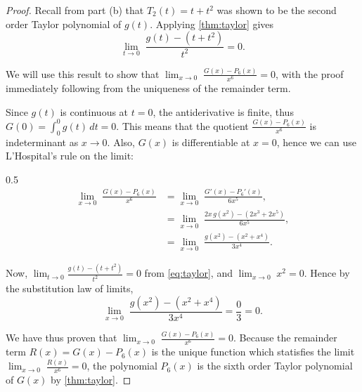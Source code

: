 \begin{enumerate}
\begin{enumerate}
\begin{proof}
                    Recall from part (b) that $T_2(t) = t + t^2$ was shown to be the second order Taylor polynomial of $g(t)$.
                    Applying \cref{thm:taylor} gives
                    \begin{equation} \label{eq:taylor}
                        \lim_{t \to 0} \; \frac{g(t) - (t + t^2)}{t^2} = 0.
                    \end{equation}

                    We will use this result to show that $\lim_{x \to 0} \; \frac{G(x) - P_6(x)}{x^6} = 0$, with the proof immediately following from the uniqueness of the remainder term.

                    Since $g(t)$ is continuous at $t = 0$, the antiderivative is finite, thus $G(0) = \int_0^0 g(t) \, dt = 0$.
                    This means that the quotient $\frac{G(x) - P_6(x)}{x^6}$ is indeterminant as $x \to 0$.
                    Also, $G(x)$ is differentiable at $x = 0$, hence we can use L'Hospital's rule on the limit:
                    \begin{spreadlines}{0.5\baselineskip}
                        \begin{align*}
                            \lim_{x \to 0} \; \frac{G(x) - P_6(x)}{x^6} &= \lim_{x \to 0} \; \frac{G'(x) - P_6'(x)}{6 x^5}, \\
                            &= \lim_{x \to 0} \; \frac{2 x \, g(x^2) - (2 x^3 + 2 x^5)}{6 x^5}, \\
                            &= \lim_{x \to 0} \; \frac{g(x^2) - (x^2 + x^4)}{3 x^4}.
                        \end{align*}
                    \end{spreadlines}

                    Now, $\lim_{t \to 0} \frac{g(t) - (t + t^2)}{t^2} = 0$ from \cref{eq:taylor}, and $\lim_{x \to 0} \; x^2 = 0$.
                    Hence by the substitution law of limits,
                    \[ \lim_{x \to 0} \; \frac{g(x^2) - (x^2 + x^4)}{3 x^4} = \frac{0}{3} = 0. \]

                    We have thus proven that $\lim_{x \to 0} \; \frac{G(x) - P_6(x)}{x^6} = 0$.
                    Because the remainder term $R(x) = G(x) - P_6(x)$ is the unique function which statisfies the limit $\lim_{x \to 0} \; \frac{R(x)}{x^6} = 0$, the polynomial $P_6(x)$ is the sixth order Taylor polynomial of $G(x)$ by \cref{thm:taylor}.
                \end{proof}

                \bigskip


\end{enumerate}
\end{enumerate}
